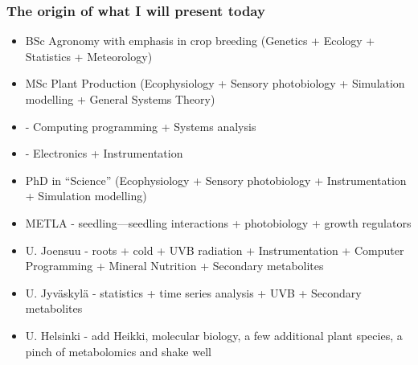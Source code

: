 \documentclass[10pt]{beamer}\usepackage[]{graphicx}\usepackage[]{color}
\begin{document}
\begin{frame}
  \frametitle{The origin of what I will present today}
  \begin{itemize}
    \item BSc Agronomy with emphasis in crop breeding (Genetics + Ecology + Statistics + Meteorology)
    \item MSc Plant Production (Ecophysiology + Sensory photobiology + Simulation modelling + General Systems Theory)
    \item - Computing programming + Systems analysis
    \item - Electronics + Instrumentation
    \item PhD in ``Science'' (Ecophysiology + Sensory photobiology + Instrumentation + Simulation modelling)
    \item METLA - seedling---seedling interactions + photobiology + growth regulators
    \item U. Joensuu - roots + cold + UVB radiation + Instrumentation + Computer Programming + Mineral Nutrition + Secondary metabolites
    \item U. Jyväskylä - statistics + time series analysis + UVB + Secondary metabolites
    \item U. Helsinki - add Heikki, molecular biology, a few additional plant species, a pinch of metabolomics and shake well
  \end{itemize}
\end{frame}
\end{document}
